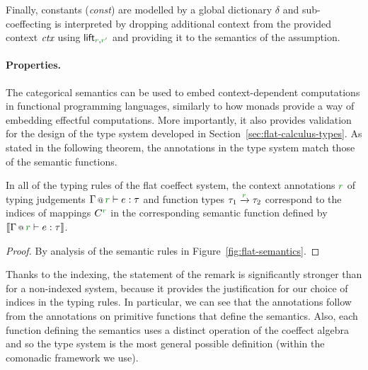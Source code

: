 Finally, constants (\emph{const}) are modelled by a global dictionary $\delta$ and sub-coeffecting
is interpreted by dropping additional context from the provided context $\textit{ctx}$ using 
$\ident{lift}_{\cclrd{r}, \cclrd{r'}}$ and providing it to the semantics of the assumption.

\paragraph{Properties.}

The categorical semantics can be used to embed context-dependent computations in functional 
programming languages, similarly to how monads provide a way of embedding effectful computations.
More importantly, it also provides validation for the design of the type system developed in 
Section~\ref{sec:flat-calculus-types}. As stated in the following theorem, the annotations in 
the type system match those of the semantic functions.

\vspace{2em}

\begin{remark}[Correspondence]
In all of the typing rules of the flat coeffect system, the context annotations $\cclrd{r}$ of typing 
judgements $\coctx{\Gamma}{\cclrd{r}} \vdash e : \tau$ and function types $\tau_1 \xrightarrow{\cclrd{r}} \tau_2$ 
correspond to the indices of mappings $\ctyp{\cclrd{r}}{}$ in the corresponding semantic function defined 
by $\sem{\coctx{\Gamma}{\cclrd{r}} \vdash e : \tau}$.
\end{remark}
\begin{proof}
By analysis of the semantic rules in Figure~\ref{fig:flat-semantics}.
\end{proof}

\noindent
Thanks to the indexing, the statement of the remark is significantly stronger than for a 
non-indexed system, because it provides the justification for our choice of indices in the typing
rules. In particular, we can see that the annotations follow from the annotations on primitive 
functions that define the semantics. Also, each function defining the semantics uses a distinct 
operation of the coeffect algebra and so the type system is the most general possible definition
(within the comonadic framework we use).



%                                                                   
%

